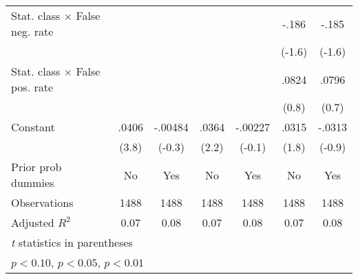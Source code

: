 \begin{table}[htbp]
\begin{tabular}{l*{6}{c}}
Stat. class $\times$ False neg. rate&                  &                  &                  &                  &    -.186         &    -.185         \\
                &                  &                  &                  &                  &   (-1.6)         &   (-1.6)         \\
Stat. class $\times$ False pos. rate&                  &                  &                  &                  &    .0824         &    .0796         \\
                &                  &                  &                  &                  &    (0.8)         &    (0.7)         \\
Constant        &    .0406\sym{***}&  -.00484         &    .0364\sym{**} &  -.00227         &    .0315\sym{*}  &   -.0313         \\
                &    (3.8)         &   (-0.3)         &    (2.2)         &   (-0.1)         &    (1.8)         &   (-0.9)         \\
Prior prob dummies &       No         &      Yes         &       No         &      Yes         &       No         &      Yes         \\
\hline
Observations    &     1488         &     1488         &     1488         &     1488         &     1488         &     1488         \\
Adjusted \(R^{2}\)&     0.07         &     0.08         &     0.07         &     0.08         &     0.07         &     0.08         \\
\hline\hline
\multicolumn{7}{l}{\footnotesize \textit{t} statistics in parentheses}\\
\multicolumn{7}{l}{\footnotesize \sym{*} \(p<0.10\), \sym{**} \(p<0.05\), \sym{***} \(p<0.01\)}\\
\end{tabular}
\end{table}
